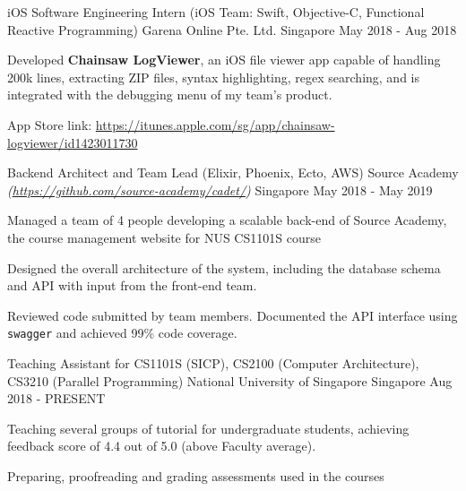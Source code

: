 \begin{cventries}
  \cventry
  {iOS Software Engineering Intern (iOS Team: Swift, Objective-C, Functional Reactive Programming)} %
  {Garena Online Pte. Ltd.} %
  {Singapore} %
  {May 2018 - Aug 2018} %
  {
    \begin{cvitems}
      \item {Developed \textbf{Chainsaw LogViewer}, an iOS file viewer app capable of handling 200k lines, extracting ZIP files, syntax highlighting, regex searching, and is integrated with the debugging menu of my team's product.}
      \item {App Store link: \url{https://itunes.apple.com/sg/app/chainsaw-logviewer/id1423011730}}
    \end{cvitems}
  }

  \cventry
  {Backend Architect and Team Lead (Elixir, Phoenix, Ecto, AWS)} %
  {Source Academy \textmd{\em\tiny(\url{https://github.com/source-academy/cadet/})}} %
  {Singapore} %
  {May 2018 - May 2019} %
  {
    \begin{cvitems}
      \item {Managed a team of 4 people developing a scalable back-end of Source Academy, the course management website for NUS CS1101S course}
      \item {Designed the overall architecture of the system, including the database schema and API with input from the front-end team.}
      \item {Reviewed code submitted by team members. Documented the API interface using \texttt{swagger} and achieved 99\% code coverage.}
    \end{cvitems}
  }
  \cventry
  {Teaching Assistant for CS1101S (SICP), CS2100 (Computer Architecture), CS3210 (Parallel Programming)} %
  {National University of Singapore} %
  {Singapore} %
  {Aug 2018 - PRESENT} %
  {
    \begin{cvitems}
      \item {Teaching several groups of tutorial for undergraduate students, achieving feedback score of 4.4 out of 5.0 (above Faculty average).}
      \item {Preparing, proofreading and grading assessments used in the courses}
    \end{cvitems}
  }

\end{cventries}
